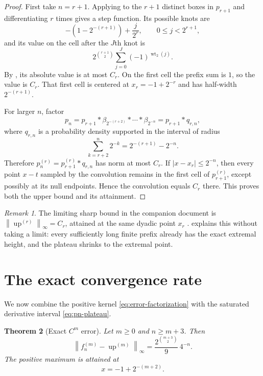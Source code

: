 \documentclass[11pt,oneside]{article}
\newtheorem{theorem}{Theorem}[section]
\theoremstyle{definition}
\theoremstyle{remark}
\newtheorem{remark}[theorem]{Remark}
\newcommand{\Up}{\operatorname{up}}
\newcommand{\wt}{\operatorname{wt}_2}
\newcommand{\norm}[1]{\left\lVert #1\right\rVert}
\begin{document}
\begin{proof}
First take $n=r+1$.  Applying  to the $r+1$ distinct boxes in
$p_{r+1}$ and differentiating $r$ times gives a step function.  Its possible knots are
\[
 -\left(1-2^{-(r+1)}\right)+\frac{j}{2^r},
 \qquad 0\le j<2^{r+1},
\]
and its value on the cell after the $J$th knot is
\[
 2^{\binom{r+1}{2}}\sum_{j=0}^{J}(-1)^{\wt(j)}.
\]
By , its absolute value is at most $C_r$.  On the first cell the prefix
sum is $1$, so the value is $C_r$.  That first cell is centered at $x_r=-1+2^{-r}$ and has
half-width $2^{-(r+1)}$.

For larger $n$, factor
\[
 p_n=p_{r+1}*\beta_{2^{-(r+2)}}*\cdots*\beta_{2^{-n}}
     =p_{r+1}*q_{r,n},
\]
where $q_{r,n}$ is a probability density supported in the interval of radius
\[
 \sum_{k=r+2}^{n}2^{-k}=2^{-(r+1)}-2^{-n}.
\]
Therefore $p_n^{(r)}=p_{r+1}^{(r)}*q_{r,n}$ has norm at most $C_r$.  If
$|x-x_r|\le2^{-n}$, then every point $x-t$ sampled by the convolution remains in the first
cell of $p_{r+1}^{(r)}$, except possibly at its null endpoints.  Hence the convolution equals
$C_r$ there.  This proves both the upper bound and its attainment.
\end{proof}

\begin{remark}
The limiting sharp bound in the companion document is
$\norm{\Up^{(r)}}_\infty=C_r$, attained at the same dyadic point $x_r$ \cite{companion}.
 explains this without taking a limit: every sufficiently long finite
prefix already has the exact extremal height, and the plateau shrinks to the extremal point.
\end{remark}

\section{The exact convergence rate}
\label{sec:exact-rate}

We now combine the positive kernel \eqref{eq:error-factorization} with the saturated derivative
interval \eqref{eq:pn-plateau}.

\begin{theorem}[Exact $C^m$ error]
\label{thm:exact-Cm-error}
Let $m\ge0$ and $n\ge m+3$.  Then
\begin{equation}
 \boxed{\displaystyle
 \norm{f_n^{(m)}-\Up^{(m)}}_\infty
 =\frac{2^{\binom{m+3}{2}}}{9}\,4^{-n}.}                  \label{eq:exact-Cm-error}
\end{equation}
The positive maximum is attained at
\begin{equation}
 x=-1+2^{-(m+2)}.                                          \label{eq:error-extremal-point}
\end{equation}
\end{theorem}
\end{document}
